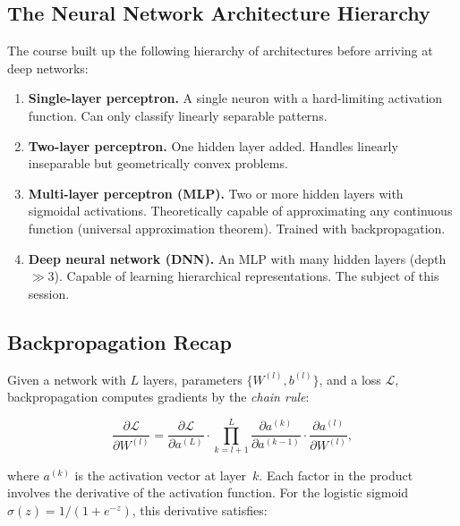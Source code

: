 \documentclass[12pt,a4paper]{article}
\newcommand{\sigmoid}{\sigma}
\newcommand{\Loss}{\mathcal{L}}
\begin{document}
\subsection{The Neural Network Architecture Hierarchy}
\label{subsec:hierarchy}

The course built up the following hierarchy of architectures before
arriving at deep networks:

\begin{enumerate}[label=\textbf{Step \arabic*.}, leftmargin=3cm]
  \item \textbf{Single-layer perceptron.}  A single neuron with a
        hard-limiting activation function.  Can only classify linearly
        separable patterns.
  \item \textbf{Two-layer perceptron.}  One hidden layer added.
        Handles linearly inseparable but geometrically convex problems.
  \item \textbf{Multi-layer perceptron (MLP).}  Two or more hidden
        layers with sigmoidal activations.  Theoretically capable of
        approximating any continuous function (universal approximation
        theorem).  Trained with backpropagation.
  \item \textbf{Deep neural network (DNN).}  An MLP with many hidden
        layers (depth $\gg 3$).  Capable of learning hierarchical
        representations.  The subject of this session.
\end{enumerate}

\subsection{Backpropagation Recap}
\label{subsec:backprop_recap}

Given a network with $L$ layers, parameters $\{W^{(l)}, b^{(l)}\}$,
and a loss $\Loss$, backpropagation computes gradients by the
\emph{chain rule}:

\begin{equation}
  \frac{\partial \Loss}{\partial W^{(l)}}
  = \frac{\partial \Loss}{\partial a^{(L)}}
    \cdot \prod_{k=l+1}^{L}
          \frac{\partial a^{(k)}}{\partial a^{(k-1)}}
    \cdot \frac{\partial a^{(l)}}{\partial W^{(l)}},
  \label{eq:backprop_chain}
\end{equation}

where $a^{(k)}$ is the activation vector at layer~$k$.  Each factor in
the product involves the derivative of the activation function.  For
the logistic sigmoid $\sigmoid(z) = 1/(1 + e^{-z})$, this derivative
satisfies:
\end{document}
